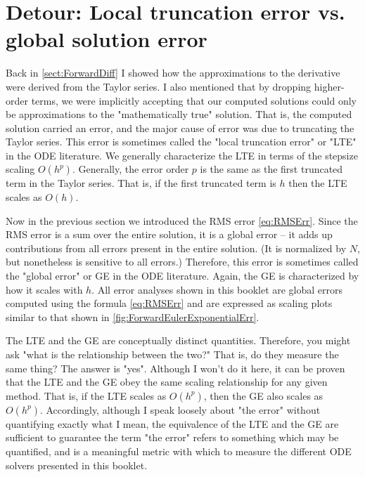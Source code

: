 \documentclass[hidelinks,notitlepage]{book}
\begin{document}
\section{Detour: Local truncation error vs. global solution error}
Back in \cref{sect:ForwardDiff} I showed how the approximations to the derivative were derived from the Taylor series.  I also mentioned that by dropping higher-order terms, we were implicitly accepting that our computed solutions could only be approximations to the "mathematically true" solution.  That is, the computed solution carried an error, and the major cause of error was due to truncating the Taylor series.  This error is sometimes called the "local truncation error" or "LTE" in the ODE literature.  We generally characterize the LTE in terms of the stepsize scaling $O(h^p)$.  Generally, the error order $p$ is the same as the first truncated term in the Taylor series.  That is, if the first truncated term is $h$ then the LTE scales as $O(h)$.

Now in the previous section we introduced the RMS error \cref{eq:RMSErr}.  Since the RMS error is a sum over the entire solution, it is a global error -- it adds up contributions from all errors present in the entire solution.  (It is normalized by $N$, but nonetheless is sensitive to all errors.)  Therefore, this error is sometimes called the "global error" or GE in the ODE literature.  Again, the GE is characterized by how it scales with $h$.  All error analyses shown in this booklet are global errors computed using the formula  \cref{eq:RMSErr} and are expressed as scaling plots similar to that shown in \cref{fig:ForwardEulerExponentialErr}.

The LTE and the GE are conceptually distinct quantities.  Therefore, you might ask "what is the relationship between the two?"  That is, do they measure the same thing?  The answer is "yes".  Although I won't do it here, it can be proven that the LTE and the GE obey the same scaling relationship for any given method.  That is, if the LTE scales as $O(h^p)$, then the GE also scales as $O(h^p)$.  Accordingly, although I speak loosely about "the error" without quantifying exactly what I mean, the equivalence of the LTE and the GE are sufficient to guarantee the term "the error" refers to something which may be quantified, and is a meaningful metric with which to measure the different ODE solvers presented in this booklet.
\end{document}
